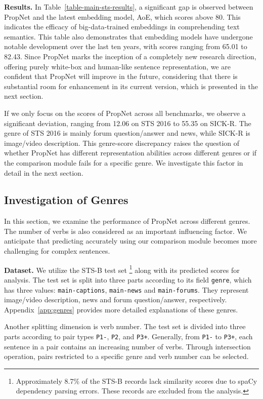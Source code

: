 \textbf{Results. } In Table~\ref{table-main-sts-results}, a significant gap is observed between PropNet and the latest embedding model, AoE, which scores above 80. This indicates the efficacy of big-data-trained embeddings in comprehending text semantics. This table also demonstrates that embedding models have undergone notable development over the last ten years, with scores ranging from 65.01 to 82.43. Since PropNet marks the inception of a completely new research direction, offering purely white-box and human-like sentence representation, we are confident that PropNet will improve in the future, considering that there is substantial room for enhancement in its current version, which is presented in the next section.

If we only focus on the scores of PropNet across all benchmarks, we observe a significant deviation, ranging from 12.06 on STS 2016 to 55.35 on SICK-R. The genre of STS 2016 is mainly forum question/answer and news, while SICK-R is image/video description. This genre-score discrepancy raises the question of whether PropNet has different representation abilities across different genres or if the comparison module fails for a specific genre. We investigate this factor in detail in the next section.



\subsection{Investigation of Genres}

In this section, we examine the performance of PropNet across different genres. The number of verbs is also considered as an important influencing factor. We anticipate that predicting accurately using our comparison module becomes more challenging for complex sentences.

\textbf{Dataset.} We utilize the STS-B test set \footnote{Approximately 8.7\% of the STS-B records lack similarity scores due to spaCy dependency parsing errors. These records are excluded from the analysis.} along with its predicted scores for analysis. The test set is split into three parts according to its field \texttt{genre}, which has three values: \texttt{main-captions}, \texttt{main-news} and \texttt{main-forums}. They represent image/video description, news and forum question/answer, respectively. Appendix~\ref{app:genres} provides more detailed explanations of these genres.


Another splitting dimension is verb number. The test set is divided into three parts according to pair types \texttt{P1-}, \texttt{P2}, and \texttt{P3+}. Generally, from \texttt{P1-} to \texttt{P3+}, each sentence in a pair contains an increasing number of verbs. Through intersection operation, pairs restricted to a specific genre and verb number can be selected.


